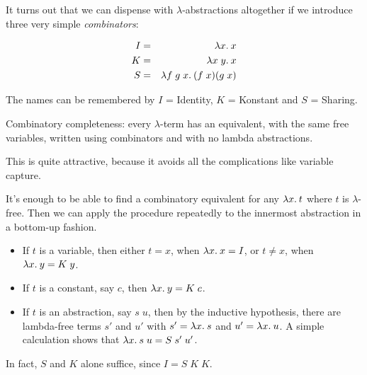 \begin{slide*}


\vspace*{0.5cm}

It turns out that we can dispense with $\lambda$-abstractions altogether if we
introduce three very simple {\em combinators}:

\begin{red}
\begin{eqnarray*}
I & = & \lambda x.\: x                              \\
K & = & \lambda x\; y.\: x                          \\
S & = & \lambda f\; g\; x.\: (f\; x)(g\; x)
\end{eqnarray*}
\end{red}

The names can be remembered by {\red $I$} = Identity, {\red $K$} = Konstant and
{\red $S$} = Sharing.

Combinatory completeness: every $\lambda$-term has an equivalent, with the same
free variables, written using combinators and with no lambda abstractions.

This is quite attractive, because it avoids all the complications like variable
capture.

\end{slide*}


\begin{slide*}


\vspace*{0.5cm}

It's enough to be able to find a combinatory equivalent for any {\red $\lambda x.\:
t$} where {\red $t$} is {\red $\lambda$}-free. Then we can apply the procedure
repeatedly to the innermost abstraction in a bottom-up fashion.

\begin{itemize}

\item If {\red $t$} is a variable, then either {\red $t = x$}, when {\red
$\lambda x.\: x = I$}, or {\red $t \not= x$}, when {\red $\lambda x.\: y = K\; y$}.

\item If {\red $t$} is a constant, say {\red $c$}, then {\red $\lambda x.\: y = K\;
c$}.


\item If {\red $t$} is an abstraction, say {\red $s\; u$}, then by the
inductive hypothesis, there are lambda-free terms {\red $s'$} and {\red $u'$}
with {\red $s' = \lambda x.\: s$} and {\red $u' = \lambda x.\: u$}. A simple calculation
shows that {\red $\lambda x.\: s\; u = S\;s'\;u'$}.

\end{itemize}

In fact, {\red $S$} and {\red $K$} alone suffice, since {\red $I = S\; K\; K$}.

\end{slide*}




